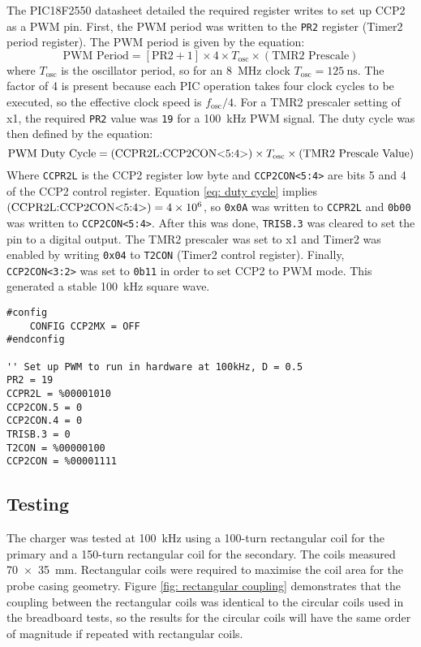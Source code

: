 The PIC18F2550 datasheet \cite{pic18f2550} detailed the required register writes to set up CCP2 as a PWM pin. First, the PWM period was written to the \verb|PR2| register (Timer2 period register). The PWM period is given by the equation:
\begin{equation}
\text{PWM Period} = [\text{PR2}+1] \times 4 \times T_\text{osc} \times (\text{TMR2 Prescale})
\end{equation}
where $T_\text{osc}$ is the oscillator period, so for an \SI{8}{\mega\hertz} clock $T_\text{osc}=\SI{125}{\nano\second}$. The factor of 4 is present because each PIC operation takes four clock cycles to be executed, so the effective clock speed is $f_\text{osc}/4$. For a TMR2 prescaler setting of x1, the required \verb|PR2| value was \verb|19| for a \SI{100}{\kilo\hertz} PWM signal. The duty cycle was then defined by the equation:
\begin{equation}
\text{PWM Duty Cycle} = (\text{CCPR2L:CCP2CON\textless5:4\textgreater}) \times T_\text{osc} \times (\text{TMR2 Prescale Value}) \label{eq: duty cycle}
\end{equation}
Where \verb|CCPR2L| is the CCP2 register low byte and \verb|CCP2CON<5:4>| are bits 5 and 4 of the CCP2 control register. Equation \ref{eq: duty cycle} implies $(\text{CCPR2L:CCP2CON\textless5:4\textgreater}) = \num{4e6}$, so \verb|0x0A| was written to \verb|CCPR2L| and \verb|0b00| was written to \verb|CCP2CON<5:4>|. After this was done, \verb|TRISB.3| was cleared to set the pin to a digital output. The TMR2 prescaler was set to x1 and Timer2 was enabled by writing \verb|0x04| to \verb|T2CON| (Timer2 control register). Finally, \verb|CCP2CON<3:2>| was set to \verb|0b11| in order to set CCP2 to PWM mode. This generated a stable \SI{100}{\kilo\hertz} square wave.

\begin{lstlisting}
#config
    CONFIG CCP2MX = OFF
#endconfig

'' Set up PWM to run in hardware at 100kHz, D = 0.5
PR2 = 19
CCPR2L = %00001010
CCP2CON.5 = 0
CCP2CON.4 = 0
TRISB.3 = 0
T2CON = %00000100
CCP2CON = %00001111
\end{lstlisting}




\subsection{Testing}
The charger was tested at \SI{100}{\kilo\hertz} using a 100-turn rectangular coil for the primary and a 150-turn rectangular coil for the secondary. The coils measured \SI{70 x 35}{\milli\metre}. Rectangular coils were required to maximise the coil area for the probe casing geometry. Figure \ref{fig: rectangular coupling} demonstrates that the coupling between the rectangular coils was identical to the circular coils used in the breadboard tests, so the results for the circular coils will have the same order of magnitude if repeated with rectangular coils.\\

